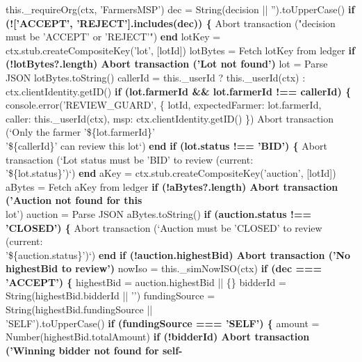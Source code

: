 \documentclass[12pt]{article}
\begin{document}
\begin{algorithm}[H]
\caption{farmerReviewBidForLot() (Part 1 of 3)}
this.\_requireOrg(ctx, 'FarmersMSP')\;
dec = String(decision || '').toUpperCase()\;
\textbf{if (!['ACCEPT', 'REJECT'].includes(dec)) \{}\;
Abort transaction ("decision must be 'ACCEPT' or 'REJECT'")\;
\textbf{end}\;
lotKey = ctx.stub.createCompositeKey('lot', [lotId])\;
lotBytes = Fetch lotKey from ledger\;
\textbf{if (!lotBytes?.length) Abort transaction ('Lot not found')}\;
lot = Parse JSON lotBytes.toString()\;
callerId = this.\_userId ? this.\_userId(ctx) :\\
\quad ctx.clientIdentity.getID()\;
\textbf{if (lot.farmerId \&\& lot.farmerId !== callerId) \{}\;
console.error('REVIEW\_GUARD', \{ lotId, expectedFarmer: lot.farmerId,\\
\quad caller: this.\_userId(ctx), msp: ctx.clientIdentity.getID() \})\;
Abort transaction (`Only the farmer '\$\{lot.farmerId\}'\\
\quad '\$\{callerId\}' can review this lot`)\;
\textbf{end}\;
\textbf{if (lot.status !== 'BID') \{}\;
Abort transaction (`Lot status must be 'BID' to review (current:\\
\quad '\$\{lot.status\}')`)\;
\textbf{end}\;
aKey = ctx.stub.createCompositeKey('auction', [lotId])\;
aBytes = Fetch aKey from ledger\;
\textbf{if (!aBytes?.length) Abort transaction ('Auction not found for this}\\
\quad lot')\;
auction = Parse JSON aBytes.toString()\;
\textbf{if (auction.status !== 'CLOSED') \{}\;
Abort transaction (`Auction must be 'CLOSED' to review (current:\\
\quad '\$\{auction.status\}')`)\;
\textbf{end}\;
\textbf{if (!auction.highestBid) Abort transaction ('No highestBid to review')}\;
nowIso = this.\_simNowISO(ctx)\;
\textbf{if (dec === 'ACCEPT') \{}\;
highestBid = auction.highestBid || \{\}\;
bidderId = String(highestBid.bidderId || '')\;
fundingSource = String(highestBid.fundingSource ||\\
\quad 'SELF').toUpperCase()\;
\textbf{if (fundingSource === 'SELF') \{}\;
amount = Number(highestBid.totalAmount)\;
\textbf{if (!bidderId) Abort transaction ('Winning bidder not found for self-}\\
\end{algorithm}
\end{document}
